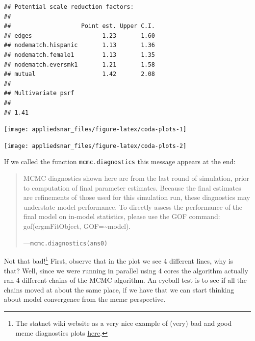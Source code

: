 \documentclass[]{book}
\newenvironment{Shaded}{\begin{snugshade}}{\end{snugshade}}
\newcommand{\KeywordTok}[1]{\textcolor[rgb]{0.13,0.29,0.53}{\textbf{#1}}}
\newcommand{\OperatorTok}[1]{\textcolor[rgb]{0.81,0.36,0.00}{\textbf{#1}}}
\newcommand{\NormalTok}[1]{#1}
\let\rmarkdownfootnote\footnote%
\def\footnote{\protect\rmarkdownfootnote}
\theoremstyle{definition}
\theoremstyle{definition}
\theoremstyle{definition}
\theoremstyle{remark}
\begin{document}
\begin{enumerate}
\begin{Shaded}
\end{Shaded}

\begin{verbatim}
## Potential scale reduction factors:
## 
##                    Point est. Upper C.I.
## edges                    1.23       1.60
## nodematch.hispanic       1.13       1.36
## nodematch.female1        1.13       1.35
## nodematch.eversmk1       1.21       1.58
## mutual                   1.42       2.08
## 
## Multivariate psrf
## 
## 1.41
\end{verbatim}
\end{enumerate}

\begin{Shaded}
\end{Shaded}

\begin{center}\texttt{[image: appliedsnar\_files/figure-latex/coda-plots-1]} \end{center}

\begin{center}\texttt{[image: appliedsnar\_files/figure-latex/coda-plots-2]} \end{center}

If we called the function \texttt{mcmc.diagnostics} this message appears
at the end:

\begin{quote}
MCMC diagnostics shown here are from the last round of simulation, prior
to computation of final parameter estimates. Because the final estimates
are refinements of those used for this simulation run, these diagnostics
may understate model performance. To directly assess the performance of
the final model on in-model statistics, please use the GOF command:
gof(ergmFitObject, GOF=\textasciitilde{}model).

---\texttt{mcmc.diagnostics(ans0)}
\end{quote}

Not that bad!\footnote{The statnet wiki website as a very nice example
  of (very) bad and good mcmc diagnostics plots
  \href{https://statnet.org/trac/raw-attachment/wiki/Resources/ergm.fit.diagnostics.pdf}{here}.}
First, observe that in the plot we see 4 different lines, why is that?
Well, since we were running in parallel using 4 cores the algorithm
actually ran 4 different chains of the MCMC algorithm. An eyeball test
is to see if all the chains moved at about the same place, if we have
that we can start thinking about model convergence from the mcmc
perspective.
\end{document}
